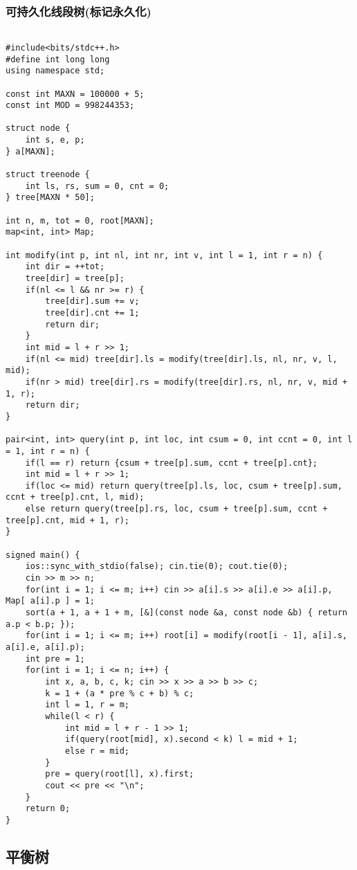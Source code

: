 \subsubsection{可持久化线段树(标记永久化)}
\begin{lstlisting}

#include<bits/stdc++.h>
#define int long long
using namespace std;

const int MAXN = 100000 + 5;
const int MOD = 998244353;

struct node {
	int s, e, p;
} a[MAXN];

struct treenode {
	int ls, rs, sum = 0, cnt = 0;
} tree[MAXN * 50];

int n, m, tot = 0, root[MAXN];
map<int, int> Map;

int modify(int p, int nl, int nr, int v, int l = 1, int r = n) {
	int dir = ++tot;
	tree[dir] = tree[p];
	if(nl <= l && nr >= r) {
		tree[dir].sum += v;
		tree[dir].cnt += 1;
		return dir;
	}
	int mid = l + r >> 1;
	if(nl <= mid) tree[dir].ls = modify(tree[dir].ls, nl, nr, v, l, mid);
	if(nr > mid) tree[dir].rs = modify(tree[dir].rs, nl, nr, v, mid + 1, r);
	return dir;
}

pair<int, int> query(int p, int loc, int csum = 0, int ccnt = 0, int l = 1, int r = n) {
	if(l == r) return {csum + tree[p].sum, ccnt + tree[p].cnt};
	int mid = l + r >> 1;
	if(loc <= mid) return query(tree[p].ls, loc, csum + tree[p].sum, ccnt + tree[p].cnt, l, mid);
	else return query(tree[p].rs, loc, csum + tree[p].sum, ccnt + tree[p].cnt, mid + 1, r);
}

signed main() {
	ios::sync_with_stdio(false); cin.tie(0); cout.tie(0);
	cin >> m >> n;
	for(int i = 1; i <= m; i++) cin >> a[i].s >> a[i].e >> a[i].p, Map[ a[i].p ] = 1;
	sort(a + 1, a + 1 + m, [&](const node &a, const node &b) { return a.p < b.p; });
	for(int i = 1; i <= m; i++) root[i] = modify(root[i - 1], a[i].s, a[i].e, a[i].p);
	int pre = 1;
	for(int i = 1; i <= n; i++) {
		int x, a, b, c, k; cin >> x >> a >> b >> c;
		k = 1 + (a * pre % c + b) % c;
		int l = 1, r = m;
		while(l < r) {
			int mid = l + r - 1 >> 1;
			if(query(root[mid], x).second < k) l = mid + 1;
			else r = mid;
		}
		pre = query(root[l], x).first;
		cout << pre << "\n";
	}
	return 0;
}
\end{lstlisting}

\subsection{平衡树}

